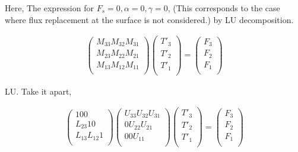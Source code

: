 Here, The expression for \(F_s = 0, \alpha=0, \gamma=0\), (This
corresponds to the case where flux replacement at the surface is not
considered.) by LU decomposition.

\begin{eqnarray}
  \left( \begin{array}{lll} M_{33}  M_{32}  M_{31} \\ M_{23} 
  M_{22}  M_{21} \\ M_{13}  M_{12}  M_{11} \\
         \end{array} \right)
  \left( \begin{array}{l}
         T'_3 \\ T'_2 \\ T'_1 \\
         \end{array} \right)
  = 
  \left(  \begin{array}{l}
          F_3 \\ F_2 \\ F_1 \\
          \end{array} \right)
\end{eqnarray}

\begin{quote}
\protect\hypertarget{summe-0}{}{\blazer[summe-0]}
\end{quote}

LU. Take it apart,

\begin{eqnarray}
  \left( \begin{array}{lll}
         1       0       0      \\
         L_{23}  1       0      \\
         L_{13}  L_{12}  1      \\
         \end{array} \right)
  \left( \begin{array}{lll}
         U_{33}  U_{32}  U_{31} \\
         0       U_{22}  U_{21} \\
         0       0       U_{11} \\
         \end{array} \right)
  \left( \begin{array}{l}
         T'_3 \\ T'_2 \\ T'_1 \\
         \end{array} \right)
  = 
  \left(  \begin{array}{l}
          F_3 \\ F_2 \\ F_1 \\
          \end{array} \right)
\end{eqnarray}

